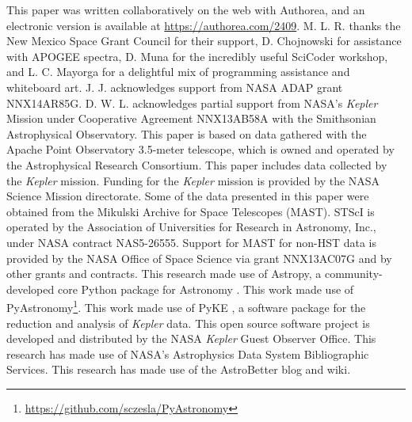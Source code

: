 \acknowledgments
This paper was written collaboratively on the web with Authorea, and an electronic version is available at \url{https://authorea.com/2409}. M. L. R. thanks the New Mexico Space Grant Council for their support, D. Chojnowski for assistance with APOGEE spectra, D. Muna for the incredibly useful SciCoder workshop, and L. C. Mayorga for a delightful mix of programming assistance and whiteboard art. J. J. acknowledges support from NASA ADAP grant NNX14AR85G. D. W. L. acknowledges partial support from NASA's \emph{Kepler} Mission under Cooperative Agreement NNX13AB58A with the Smithsonian Astrophysical Observatory. This paper is based on data gathered with the Apache Point Observatory 3.5-meter telescope, which is owned and operated by the Astrophysical Research Consortium. This paper includes data collected by the \emph{Kepler} mission. Funding for the \emph{Kepler} mission is provided by the NASA Science Mission directorate. Some of the data presented in this paper were obtained from the Mikulski Archive for Space Telescopes (MAST). STScI is operated by the Association of Universities for Research in Astronomy, Inc., under NASA contract NAS5-26555. Support for MAST for non-HST data is provided by the NASA Office of Space Science via grant NNX13AC07G and by other grants and contracts. This research made use of Astropy, a community-developed core Python package for Astronomy \citep{astropy}. This work made use of PyAstronomy\footnote{\url{https://github.com/sczesla/PyAstronomy}}. This work made use of PyKE \citep{pyke}, a software package for the reduction and analysis of \emph{Kepler} data. This open source software project is developed and distributed by the NASA \emph{Kepler} Guest Observer Office. This research has made use of NASA's Astrophysics Data System Bibliographic Services. This research has made use of the AstroBetter blog and wiki.

  
  
  